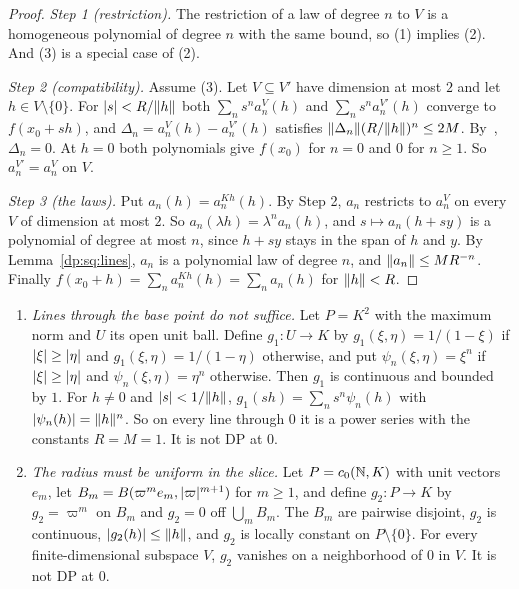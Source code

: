 \begin{proof}
\emph{Step 1 (restriction).} The restriction of a law of degree $n$ to $V$ is a homogeneous polynomial of degree $n$ with the same bound, so (1) implies (2). And (3) is a special case of (2).

\emph{Step 2 (compatibility).} Assume (3). Let $V\subseteq V'$ have dimension at most $2$ and let $h\in V\setminus\{0\}$. For $\lvert s\rvert<R/\lVert h\rVert$ both $\sum_ns^na_n^V(h)$ and $\sum_ns^na_n^{V'}(h)$ converge to $f(x_0+sh)$, and $\Delta_n=a_n^V(h)-a_n^{V'}(h)$ satisfies $\lVert \Delta_n\rVert(R/\lVert h\rVert)^n\le2M$. By~\cite[Lemma~A.1]{I}, $\Delta_n=0$. At $h=0$ both polynomials give $f(x_0)$ for $n=0$ and $0$ for $n\ge1$. So $a_n^{V'}=a_n^V$ on $V$.

\emph{Step 3 (the laws).} Put $a_n(h)=a_n^{Kh}(h)$. By Step 2, $a_n$ restricts to $a_n^V$ on every $V$ of dimension at most $2$. So $a_n(\lambda h)=\lambda^na_n(h)$, and $s\mapsto a_n(h+sy)$ is a polynomial of degree at most $n$, since $h+sy$ stays in the span of $h$ and $y$. By Lemma~\ref{dp:sq:lines}, $a_n$ is a polynomial law of degree $n$, and $\lVert a_n\rVert\le MR^{-n}$. Finally $f(x_0+h)=\sum_na_n^{Kh}(h)=\sum_na_n(h)$ for $\lVert h\rVert<R$.
\end{proof}

\begin{example}\label{dp:ex:slice-needed}
\leavevmode
\begin{enumerate}
\item \emph{Lines through the base point do not suffice.} Let $P=K^2$ with the maximum norm and $U$ its open unit ball. Define $g_1\colon U\to K$ by $g_1(\xi,\eta)=1/(1-\xi)$ if $\lvert \xi\rvert\ge\lvert \eta\rvert$ and $g_1(\xi,\eta)=1/(1-\eta)$ otherwise, and put $\psi_n(\xi,\eta)=\xi^n$ if $\lvert \xi\rvert\ge\lvert \eta\rvert$ and $\psi_n(\xi,\eta)=\eta^n$ otherwise. Then $g_1$ is continuous and bounded by $1$. For $h\ne0$ and $\lvert s\rvert<1/\lVert h\rVert$, $g_1(sh)=\sum_ns^n\psi_n(h)$ with $\lvert \psi_n(h)\rvert=\lVert h\rVert^n$. So on every line through $0$ it is a power series with the constants $R=M=1$. It is not DP at $0$.
\item \emph{The radius must be uniform in the slice.} Let $P=c_0(\mathbb N,K)$ with unit vectors $e_m$, let $B_m=B(\varpi^me_m,\lvert \varpi\rvert^{m+1})$ for $m\ge1$, and define $g_2\colon P\to K$ by $g_2=\varpi^m$ on $B_m$ and $g_2=0$ off $\bigcup_mB_m$. The $B_m$ are pairwise disjoint, $g_2$ is continuous, $\lvert g_2(h)\rvert\le\lVert h\rVert$, and $g_2$ is locally constant on $P\setminus\{0\}$. For every finite-dimensional subspace $V$, $g_2$ vanishes on a neighborhood of $0$ in $V$. It is not DP at $0$.
\end{enumerate}
\end{example}

